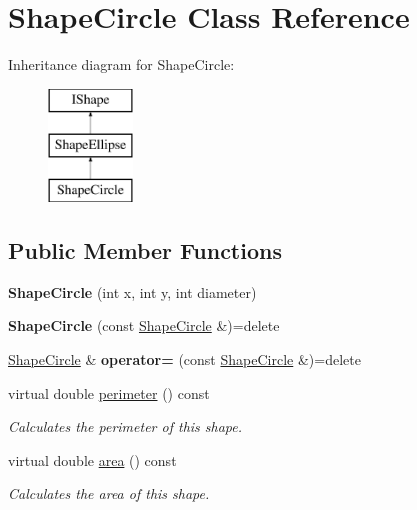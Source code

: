 \hypertarget{class_shape_circle}{}\section{Shape\+Circle Class Reference}
\label{class_shape_circle}
Inheritance diagram for Shape\+Circle\+:\begin{figure}[H]
\begin{center}
\leavevmode
\includegraphics[height=3.000000cm]{class_shape_circle}
\end{center}
\end{figure}
\subsection*{Public Member Functions}
\begin{DoxyCompactItemize}
\item 
\mbox{\label{class_shape_circle_a41ae4230eaf5b572a74fe3d9ad62c670}} 
{\bfseries Shape\+Circle} (int x, int y, int diameter)
\item 
\mbox{\label{class_shape_circle_a50e31cb35f2d632fcb9655ba209de3ac}} 
{\bfseries Shape\+Circle} (const \mbox{\hyperlink{class_shape_circle}{Shape\+Circle}} \&)=delete
\item 
\mbox{\label{class_shape_circle_ac3c25bd9c3ab31cd8001c33d79b88409}} 
\mbox{\hyperlink{class_shape_circle}{Shape\+Circle}} \& {\bfseries operator=} (const \mbox{\hyperlink{class_shape_circle}{Shape\+Circle}} \&)=delete
\item 
virtual double \mbox{\hyperlink{class_shape_circle_ad393d13676b0d0fcb36346b9a90b74af}{perimeter}} () const
\begin{DoxyCompactList}\small\item\em Calculates the perimeter of this shape. \end{DoxyCompactList}\item 
virtual double \mbox{\hyperlink{class_shape_circle_aebc30fb4ad7165778deb75f0bd2d69bd}{area}} () const
\begin{DoxyCompactList}\small\item\em Calculates the area of this shape. \end{DoxyCompactList}\end{DoxyCompactItemize}
